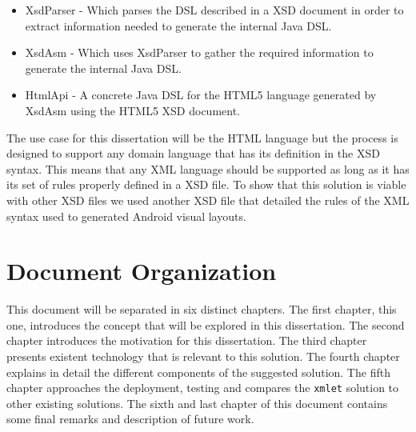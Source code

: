 \begin{itemize}
	\item XsdParser - Which parses the \ac{DSL} described in a \ac{XSD} document in order to extract information needed to generate the internal Java \ac{DSL}.
	\item XsdAsm - Which uses XsdParser to gather the required information to generate the internal Java \ac{DSL}.
	\item HtmlApi - A concrete Java \ac{DSL} for the \ac{HTML}5 language generated by XsdAsm using the \ac{HTML}5 \ac{XSD} document.
\end{itemize}

\noindent
The use case for this dissertation will be the \ac{HTML} language but the process is designed to support any domain language that has its definition in the \ac{XSD} syntax. This means that any \ac{XML} language should be supported as long as it has its set of rules properly defined in a \ac{XSD} file. To show that this solution is viable with other \ac{XSD} files we used another \ac{XSD} file that detailed the rules of the \ac{XML} syntax used to generated Android\cite{android} visual layouts.

\section{Document Organization}

This document will be separated in six distinct chapters. The first chapter, this one, introduces the concept that will be explored in this dissertation. The second chapter introduces the motivation for this dissertation. The third chapter presents existent technology that is relevant to this solution. The fourth chapter explains in detail the different components of the suggested solution. The fifth chapter approaches the deployment, testing and compares the \texttt{xmlet} solution to other existing solutions. The sixth and last chapter of this document contains some final remarks and description of future work.